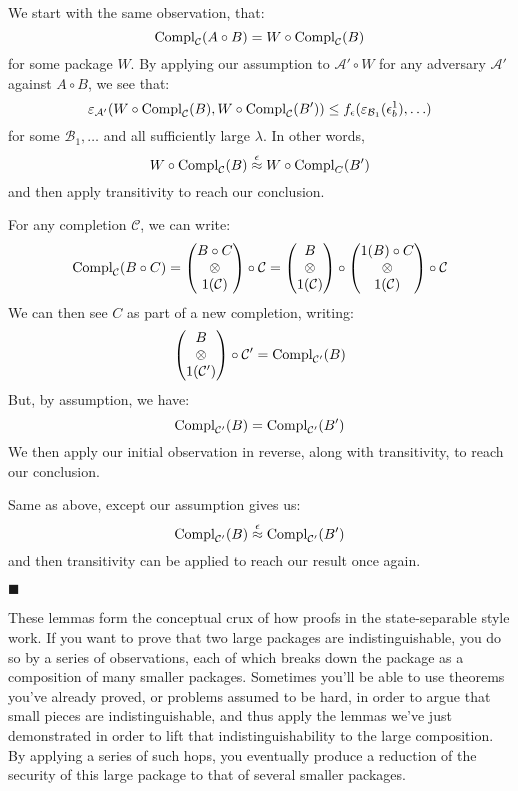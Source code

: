 \begin{lemma}
     We start with the same observation, that:
    $$
    \text{Compl}_{\mathcal{C}}(A \circ B) = W \circ \text{Compl}_{\mathcal{C}}(B)
    $$
    for some package $W$.
    By applying our assumption to $\mathcal{A}' \circ W$ for any adversary
    $\mathcal{A}'$ against $A \circ B$, we see that:
    $$
    \varepsilon_{\mathcal{A}'}(W \circ \text{Compl}_{\mathcal{C}}(B), W \circ \text{Compl}_{\mathcal{C}}(B')) \leq f_\epsilon(\varepsilon_{\mathcal{B}_1}(\epsilon^1_b), \ldots)
    $$
    for some $\mathcal{B}_1, \ldots$ and all sufficiently large $\lambda$.
    In other words,
    $$
    W \circ \text{Compl}_{\mathcal{C}}(B) \overset{\epsilon}{\approx} W \circ \text{Compl}_{C}(B')
    $$
    and then apply transitivity to reach our conclusion.

     For any completion $\mathcal{C}$, we can write:
    $$
    \text{Compl}_{\mathcal{C}}(B \circ C) =
    \begin{pmatrix}
        B \circ C\cr
        \otimes\cr
        1(\mathcal{C})
    \end{pmatrix}
    \circ \mathcal{C}
    =
    \begin{pmatrix}
        B\cr
        \otimes\cr
        1(\mathcal{C})
    \end{pmatrix}
    \circ
    \begin{pmatrix}
        1(B) \circ C\cr
        \otimes\cr
        1(\mathcal{C})
    \end{pmatrix}
    \circ \mathcal{C}
    $$
    We can then see $C$ as part of a new completion, writing:
    $$
    \begin{pmatrix}
        B\cr
        \otimes\cr
        1(\mathcal{C}')
    \end{pmatrix}
    \circ \mathcal{C}'
    = \text{Compl}_{\mathcal{C}'}(B)
    $$
    But, by assumption, we have:
    $$
    \text{Compl}_{\mathcal{C}'}(B) = 
    \text{Compl}_{\mathcal{C}'}(B')
    $$
    We then apply our initial observation in reverse, along with transitivity,
    to reach our conclusion.

     Same as above, except our assumption gives us:
    $$
    \text{Compl}_{\mathcal{C}'}(B) \overset{\epsilon}{\approx}
    \text{Compl}_{\mathcal{C}'}(B')
    $$
    and then transitivity can be applied to reach our result once again.

    $\blacksquare$
\end{lemma}

These lemmas form the conceptual crux of how proofs in the state-separable
style work.
If you want to prove that two large packages
are indistinguishable, you do so by a series of observations,
each of which breaks down the package as a composition
of many smaller packages.
Sometimes you'll be able to use theorems you've already proved,
or problems assumed to be hard, in order to argue
that small pieces are indistinguishable, and thus apply
the lemmas we've just demonstrated in order
to lift that indistinguishability to the large composition.
By applying a series of such hops, you eventually
produce a reduction of the security of this large package
to that of several smaller packages.

